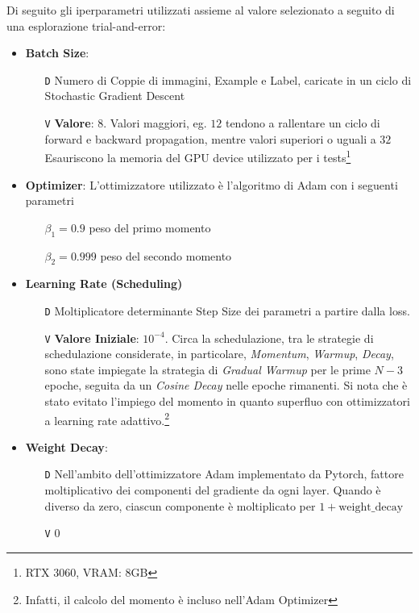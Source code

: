 \documentclass[a4paper,10pt,twocolumn]{article}
\begin{document}
Di seguito gli iperparametri utilizzati assieme al valore selezionato a seguito di una esplorazione trial-and-error:
\begin{itemize}[topsep=0pt, noitemsep]
  \item \textbf{Batch Size}:
    \begin{itemize}[topsep=0pt, noitemsep]
      \item[\texttt{D}] Numero di Coppie di immagini, Example e Label, caricate in un ciclo di Stochastic Gradient Descent
      \item[\texttt{V}] \textbf{Valore}: $8$. Valori maggiori, eg. $12$ tendono a rallentare un ciclo di forward e backward propagation,
        mentre valori superiori o uguali a $32$ Esauriscono la
        memoria del GPU device utilizzato per i tests\footnote{RTX 3060, VRAM: 8GB}\\
    \end{itemize}

  \item
    \textbf{Optimizer}: L'ottimizzatore utilizzato \`e l'algoritmo di Adam\cite{kingma2017adammethodstochasticoptimization} con i seguenti parametri
    \begin{itemize}[topsep=0pt, noitemsep]
      \item[] $\beta_1 = 0.9$ peso del primo momento
      \item[] $\beta_2 = 0.999$ peso del secondo momento
    \end{itemize}

  \item
    \textbf{Learning Rate (Scheduling)}
    \begin{itemize}[topsep=0pt, noitemsep]
      \item[\texttt{D}] Moltiplicatore determinante Step Size dei parametri a partire dalla loss.
      \item[\texttt{V}] \textbf{Valore Iniziale}: $10^{-4}$. Circa la schedulazione, tra le strategie di schedulazione considerate,
        in particolare, \textit{Momentum}, \textit{Warmup}, \textit{Decay}, sono state impiegate la strategia di \textit{Gradual Warmup}
        per le prime $N - 3$ epoche, seguita da un \textit{Cosine Decay} nelle
        epoche rimanenti. Si nota che \`e stato evitato l'impiego del momento in quanto superfluo con ottimizzatori a learning
        rate adattivo.\footnote{Infatti, il calcolo del momento \`e incluso nell'Adam Optimizer}
    \end{itemize}

  \item
    \textbf{Weight Decay}:
    \begin{itemize}[topsep=0pt, noitemsep]
      \item[\texttt{D}] Nell'ambito dell'ottimizzatore Adam implementato da Pytorch, fattore moltiplicativo dei componenti del gradiente da
        ogni layer.  Quando \`e diverso da zero, ciascun componente \`e moltiplicato per $1 + \mathrm{weight\_decay}$
      \item[\texttt{V}] $0$
    \end{itemize}


\end{itemize}
\end{document}
